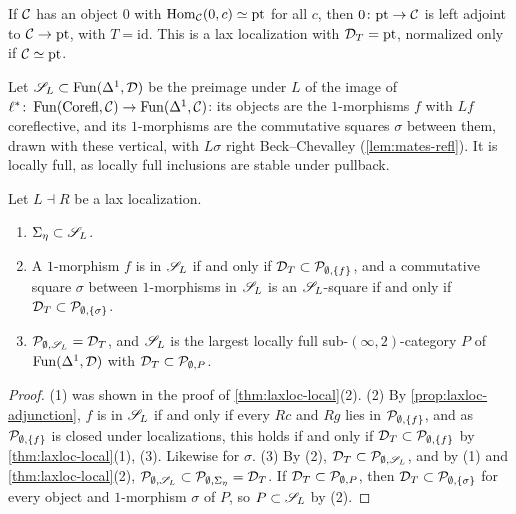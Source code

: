\begin{exmp}
\label{ex:laxloc-initial}
%
If $\mathcal{C}$ has an object $0$ with
$\operatorname{Hom}_{\mathcal{C}}(0,c) \simeq \mathrm{pt}$
for all $c$, then
$0\colon \mathrm{pt} \to \mathcal{C}$
is left adjoint to
$\mathcal{C} \to \mathrm{pt}$,
with $T = \mathrm{id}$. This is a lax localization with
$\mathcal{D}_{T} = \mathrm{pt}$,
normalized only if
$\mathcal{C} \simeq \mathrm{pt}$.
\end{exmp}

%
Let
$\mathscr{S}_{L} \subset \operatorname{Fun}(\Delta^{1},\mathcal{D})$
be the preimage under $L$ of the image of
$\ell^{*}\colon \operatorname{Fun}(\mathrm{Corefl},\mathcal{C}) \to \operatorname{Fun}(\Delta^{1},\mathcal{C})$:
its objects are the $1$-morphisms $f$ with $Lf$ coreflective, and its
$1$-morphisms are the commutative squares $\sigma$ between them,
drawn with these
vertical, with $L\sigma$ right Beck--Chevalley (\cref{lem:mates-refl}). It is
locally full, as locally full inclusions are stable under pullback.

\begin{prop}
\label{prop:laxloc-class}
%
Let $L \dashv R$ be a lax localization.
\begin{enumerate}
\item
$\Sigma_{\eta} \subset \mathscr{S}_{L}$.
\item A $1$-morphism $f$ is in $\mathscr{S}_{L}$ if and only if
$\mathcal{D}_{T} \subset \mathcal{P}_{\emptyset,\{f\}}$,
and a commutative square $\sigma$ between $1$-morphisms in $\mathscr{S}_{L}$ is an
$\mathscr{S}_{L}$-square if and only if
$\mathcal{D}_{T} \subset \mathcal{P}_{\emptyset,\{\sigma\}}$.
\item
$\mathcal{P}_{\emptyset,\mathscr{S}_{L}} = \mathcal{D}_{T}$,
and $\mathscr{S}_{L}$ is the largest locally full sub-$(\infty,2)$-category $P$ of
$\operatorname{Fun}(\Delta^{1},\mathcal{D})$ with
$\mathcal{D}_{T} \subset \mathcal{P}_{\emptyset,P}$.
\end{enumerate}
\end{prop}

\begin{proof}
%
(1) was shown in the proof of \cref{thm:laxloc-local}(2). (2) By
\cref{prop:laxloc-adjunction}, $f$ is in $\mathscr{S}_{L}$ if and only if every $Rc$
and $Rg$ lies in
$\mathcal{P}_{\emptyset,\{f\}}$,
and as
$\mathcal{P}_{\emptyset,\{f\}}$
is closed under localizations, this holds if and only if
$\mathcal{D}_{T} \subset \mathcal{P}_{\emptyset,\{f\}}$
by \cref{thm:laxloc-local}(1), (3). Likewise for $\sigma$.
(3) By (2),
$\mathcal{D}_{T} \subset \mathcal{P}_{\emptyset,\mathscr{S}_{L}}$,
and by (1) and \cref{thm:laxloc-local}(2),
$\mathcal{P}_{\emptyset,\mathscr{S}_{L}} \subset \mathcal{P}_{\emptyset,\Sigma_{\eta}} = \mathcal{D}_{T}$.
If
$\mathcal{D}_{T} \subset \mathcal{P}_{\emptyset,P}$,
then
$\mathcal{D}_{T} \subset \mathcal{P}_{\emptyset,\{\sigma\}}$
for every object and $1$-morphism $\sigma$ of $P$, so
$P \subset \mathscr{S}_{L}$
by (2).
\end{proof}

